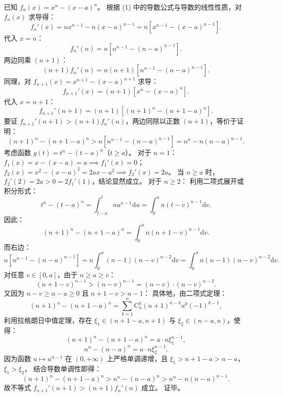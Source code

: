 \begin{answer}
已知 $f_n(x) = x^n - (x - a)^n$。
根据 (1) 中的导数公式与导数的线性性质，对 $f_n(x)$ 求导得：
\nopagebreak[4]
\[f_n'(x) = n x^{n-1} - n(x - a)^{n-1} = n \left[ x^{n-1} - (x - a)^{n-1} \right].\]
代入 $x = n$：
\nopagebreak[4]
\[f_n'(n) = n \left[ n^{n-1} - (n - a)^{n-1} \right].\]
两边同乘 $(n+1)$：
\nopagebreak[4]
\[(n+1)f_n'(n) = n(n+1) \left[ n^{n-1} - (n - a)^{n-1} \right].\]
同理，对 $f_{n+1}(x) = x^{n+1} - (x - a)^{n+1}$ 求导：
\nopagebreak[4]
\[f_{n+1}'(x) = (n+1) \left[ x^n - (x - a)^n \right].\]
代入 $x = n+1$：
\nopagebreak[4]
\[f_{n+1}'(n+1) = (n+1) \left[ (n+1)^n - (n+1 - a)^n \right].\]
要证 $f_{n+1}'(n+1) > (n+1)f_n'(n)$，两边同除以正数 $(n+1)$，等价于证明：
\nopagebreak[4]
\[(n+1)^n - (n+1 - a)^n > n \left[ n^{n-1} - (n - a)^{n-1} \right] = n^n - n(n - a)^{n-1}.\]
考虑函数 $g(t) = t^n - (t - a)^n$（$t \ge a$）。
对于 $n = 1$：
$f_1(x) = x - (x - a) = a \implies f_1'(x) = 0$；
$f_2(x) = x^2 - (x - a)^2 = 2ax - a^2 \implies f_2'(x) = 2a$。
当 $n \ge a$ 时，$f_2'(2) = 2a > 0 = 2 f_1'(1)$，结论显然成立。
对于 $n \ge 2$：
利用二项式展开或积分形式：
\nopagebreak[4]
\[t^n - (t - a)^n = \int_{t-a}^t n u^{n-1} \mathrm{d}u = \int_0^a n (t - v)^{n-1} \mathrm{d}v.\]
因此：
\nopagebreak[4]
\[(n+1)^n - (n+1 - a)^n = \int_0^a n (n+1 - v)^{n-1} \mathrm{d}v.\]
而右边：
\nopagebreak[4]
\[n \left[ n^{n-1} - (n - a)^{n-1} \right] = n \int_0^a (n-1)(n - v)^{n-2} \mathrm{d}v = \int_0^a n(n-1)(n - v)^{n-2} \mathrm{d}v.\]
对任意 $v \in [0, a]$，由于 $n \ge a \ge v$：
\nopagebreak[4]
\[(n+1 - v)^{n-1} > (n - v)^{n-1} = (n - v) \cdot (n - v)^{n-2}.\]
又因为 $n - v \ge n - a \ge 0$ 且 $n+1 - v > n-1$：
具体地，由二项式定理：
\nopagebreak[4]
\[(n+1)^n - (n+1-a)^n = \sum_{k=1}^n \mathrm{C}_n^k (n+1)^{n-k} a^k (-1)^{k-1},\]
利用拉格朗日中值定理，存在 $\xi_1 \in (n+1-a, n+1)$ 与 $\xi_2 \in (n-a, n)$，使得：
\nopagebreak[4]
\[(n+1)^n - (n+1-a)^n = a \cdot n \xi_1^{n-1},\]
\nopagebreak[4]
\[n^n - (n-a)^n = a \cdot n \xi_2^{n-1}.\]
因为函数 $u \mapsto u^{n-1}$ 在 $(0, +\infty)$ 上严格单调递增，且 $\xi_1 > n+1-a > n-a$，$\xi_1 > \xi_2$，
结合导数单调性即得：
\nopagebreak[4]
\[(n+1)^n - (n+1-a)^n > n^n - (n-a)^n > n^n - n(n-a)^{n-1}.\]
故不等式 $f_{n+1}'(n+1) > (n+1)f_n'(n)$ 成立。
证毕。



\end{answer}
